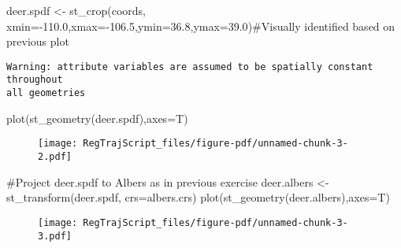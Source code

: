 \documentclass[
  letterpaper,
]{book}
\newenvironment{Shaded}{\begin{snugshade}}{\end{snugshade}}
\newcommand{\AttributeTok}[1]{\textcolor[rgb]{0.40,0.45,0.13}{#1}}
\newcommand{\CommentTok}[1]{\textcolor[rgb]{0.37,0.37,0.37}{#1}}
\newcommand{\FloatTok}[1]{\textcolor[rgb]{0.68,0.00,0.00}{#1}}
\newcommand{\FunctionTok}[1]{\textcolor[rgb]{0.28,0.35,0.67}{#1}}
\newcommand{\NormalTok}[1]{\textcolor[rgb]{0.00,0.23,0.31}{#1}}
\newcommand{\OtherTok}[1]{\textcolor[rgb]{0.00,0.23,0.31}{#1}}
\newcommand{\SpecialCharTok}[1]{\textcolor[rgb]{0.37,0.37,0.37}{#1}}
\begin{document}
\begin{Shaded}
\begin{Highlighting}[]
\NormalTok{deer.spdf }\OtherTok{\textless{}{-}} \FunctionTok{st\_crop}\NormalTok{(coords, }\AttributeTok{xmin=}\SpecialCharTok{{-}}\FloatTok{110.0}\NormalTok{,}\AttributeTok{xmax=}\SpecialCharTok{{-}}\FloatTok{106.5}\NormalTok{,}\AttributeTok{ymin=}\FloatTok{36.8}\NormalTok{,}\AttributeTok{ymax=}\FloatTok{39.0}\NormalTok{)}\CommentTok{\#Visually identified based on previous plot}
\end{Highlighting}
\end{Shaded}

\begin{verbatim}
Warning: attribute variables are assumed to be spatially constant throughout
all geometries
\end{verbatim}

\begin{Shaded}
\begin{Highlighting}[]
\FunctionTok{plot}\NormalTok{(}\FunctionTok{st\_geometry}\NormalTok{(deer.spdf),}\AttributeTok{axes=}\NormalTok{T)}
\end{Highlighting}
\end{Shaded}

\begin{figure}[H]

{\centering \texttt{[image: RegTrajScript\_files/figure-pdf/unnamed-chunk-3-2.pdf]}

}

\end{figure}

\begin{Shaded}
\begin{Highlighting}[]
\CommentTok{\#Project deer.spdf to Albers as in previous exercise}
\NormalTok{deer.albers }\OtherTok{\textless{}{-}}\FunctionTok{st\_transform}\NormalTok{(deer.spdf, }\AttributeTok{crs=}\NormalTok{albers.crs)}
\FunctionTok{plot}\NormalTok{(}\FunctionTok{st\_geometry}\NormalTok{(deer.albers),}\AttributeTok{axes=}\NormalTok{T)}
\end{Highlighting}
\end{Shaded}

\begin{figure}[H]

{\centering \texttt{[image: RegTrajScript\_files/figure-pdf/unnamed-chunk-3-3.pdf]}

}

\end{figure}
\end{document}
